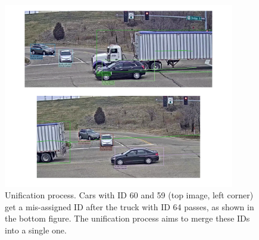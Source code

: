 \begin{figure}[H]
    \centering
    \includegraphics[width=0.90\textwidth]{images/IDSwitch.png}
    \caption[An ID-Switch example]{Unification process. Cars with ID 60 and 59 (top image, left corner) get a mis-assigned ID after the truck with ID 64 passes, as shown in the bottom figure. The unification process aims to merge these IDs into a single one.}
    \label{fig:Unification}
\end{figure}

